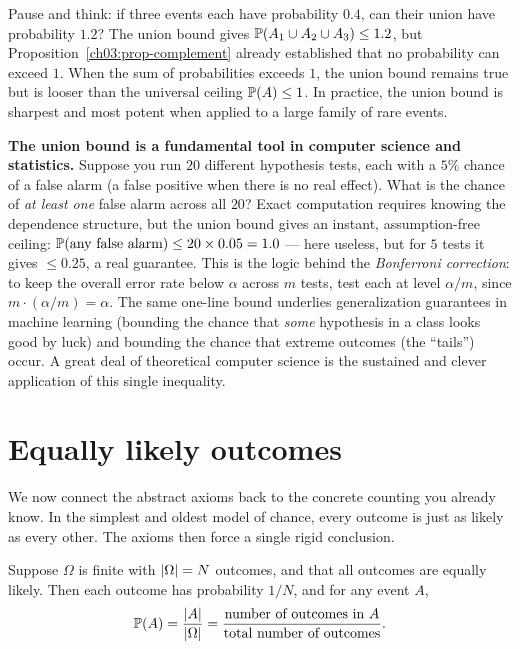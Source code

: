 Pause and think: if three events each have probability $0.4$, can their union
have probability $1.2$? The union bound gives
$\P(A_1 \cup A_2 \cup A_3) \le 1.2$, but Proposition~\ref{ch03:prop-complement}
already established that no probability can exceed $1$. When the sum of
probabilities exceeds $1$, the union bound remains true but is looser than the
universal ceiling $\P(A) \le 1$. In practice, the union bound is sharpest and
most potent when applied to a large family of rare events.

\begin{applicationbox}
\textbf{The union bound is a fundamental tool in computer science and statistics.}
Suppose you run $20$ different hypothesis tests, each with a $5\%$ chance of a false alarm (a false positive when there is no real effect). What is the chance of \emph{at least one} false alarm
across all $20$? Exact computation requires knowing the dependence structure, but
the union bound gives an instant, assumption-free ceiling:
$\P(\text{any false alarm}) \le 20 \times 0.05 = 1.0$ --- here useless, but for
$5$ tests it gives $\le 0.25$, a real guarantee. This is the logic behind the
\emph{Bonferroni correction}: to keep the overall error rate below $\alpha$ across
$m$ tests, test each at level $\alpha/m$, since
$m \cdot (\alpha/m) = \alpha$. The same one-line bound underlies generalization
guarantees in machine learning (bounding the chance that \emph{some} hypothesis
in a class looks good by luck) and bounding the chance that extreme outcomes (the ``tails'') occur. A great deal of theoretical computer science is the
sustained and clever application of this single inequality.
\end{applicationbox}

\section{Equally likely outcomes}
\label{ch03:equally-likely}

We now connect the abstract axioms back to the concrete counting you already
know. In the simplest and oldest model of chance, every outcome is just as likely
as every other. The axioms then force a single rigid conclusion.

\begin{proposition}
\label{ch03:prop-classical}
Suppose $\Omega$ is finite with $\abs{\Omega} = N$ outcomes, and that all
outcomes are equally likely. Then each outcome has probability $1/N$, and for any
event $A$,
\[
\P(A) = \frac{\abs{A}}{\abs{\Omega}} = \frac{\text{number of outcomes in } A}{\text{total number of outcomes}}.
\]
\end{proposition}

